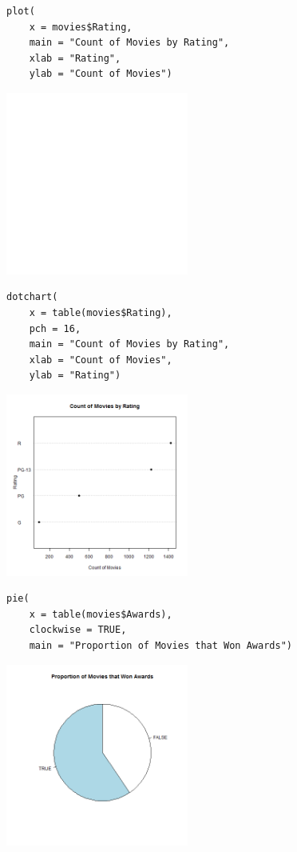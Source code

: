 \documentclass[a4paper, captions=tableheading]{tufte-book}
\begin{document}
\begin{verbatim}
plot(
	x = movies$Rating,
	main = "Count of Movies by Rating",
	xlab = "Rating",
	ylab = "Count of Movies")
\end{verbatim}

\includegraphics[height=6cm]{img/1-cat-base-01.png}


\begin{verbatim}
dotchart(
	x = table(movies$Rating),
	pch = 16,
	main = "Count of Movies by Rating",
	xlab = "Count of Movies",
	ylab = "Rating")
\end{verbatim}

\includegraphics[height=6cm]{img/1-cat-base-02.png}


\begin{verbatim}
pie(
	x = table(movies$Awards),
	clockwise = TRUE,
	main = "Proportion of Movies that Won Awards")
\end{verbatim}

\includegraphics[height=6cm]{img/1-cat-base-03.png}
\end{document}
